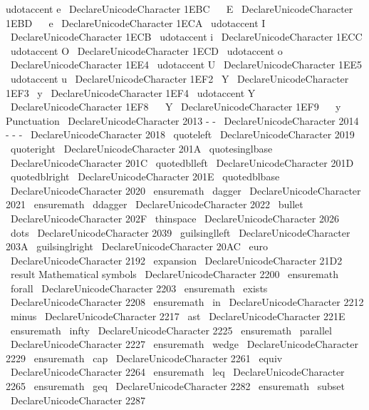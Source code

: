{{{{{{udotaccent
{
e
}
}
%
\
DeclareUnicodeCharacter
{
1EBC
}
{
\
~
E
}
%
\
DeclareUnicodeCharacter
{
1EBD
}
{
\
~
e
}
%
%
\
DeclareUnicodeCharacter
{
1ECA
}
{
\
udotaccent
{
I
}
}
%
\
DeclareUnicodeCharacter
{
1ECB
}
{
\
udotaccent
{
i
}
}
%
\
DeclareUnicodeCharacter
{
1ECC
}
{
\
udotaccent
{
O
}
}
%
\
DeclareUnicodeCharacter
{
1ECD
}
{
\
udotaccent
{
o
}
}
%
%
\
DeclareUnicodeCharacter
{
1EE4
}
{
\
udotaccent
{
U
}
}
%
\
DeclareUnicodeCharacter
{
1EE5
}
{
\
udotaccent
{
u
}
}
%
%
\
DeclareUnicodeCharacter
{
1EF2
}
{
\
Y
}
%
\
DeclareUnicodeCharacter
{
1EF3
}
{
\
y
}
%
\
DeclareUnicodeCharacter
{
1EF4
}
{
\
udotaccent
{
Y
}
}
%
%
\
DeclareUnicodeCharacter
{
1EF8
}
{
\
~
Y
}
%
\
DeclareUnicodeCharacter
{
1EF9
}
{
\
~
y
}
%
%
%
Punctuation
\
DeclareUnicodeCharacter
{
2013
}
{
-
-
}
%
\
DeclareUnicodeCharacter
{
2014
}
{
-
-
-
}
%
\
DeclareUnicodeCharacter
{
2018
}
{
\
quoteleft
{
}
}
%
\
DeclareUnicodeCharacter
{
2019
}
{
\
quoteright
{
}
}
%
\
DeclareUnicodeCharacter
{
201A
}
{
\
quotesinglbase
{
}
}
%
\
DeclareUnicodeCharacter
{
201C
}
{
\
quotedblleft
{
}
}
%
\
DeclareUnicodeCharacter
{
201D
}
{
\
quotedblright
{
}
}
%
\
DeclareUnicodeCharacter
{
201E
}
{
\
quotedblbase
{
}
}
%
\
DeclareUnicodeCharacter
{
2020
}
{
\
ensuremath
\
dagger
}
%
\
DeclareUnicodeCharacter
{
2021
}
{
\
ensuremath
\
ddagger
}
%
\
DeclareUnicodeCharacter
{
2022
}
{
\
bullet
{
}
}
%
\
DeclareUnicodeCharacter
{
202F
}
{
\
thinspace
}
%
\
DeclareUnicodeCharacter
{
2026
}
{
\
dots
{
}
}
%
\
DeclareUnicodeCharacter
{
2039
}
{
\
guilsinglleft
{
}
}
%
\
DeclareUnicodeCharacter
{
203A
}
{
\
guilsinglright
{
}
}
%
%
\
DeclareUnicodeCharacter
{
20AC
}
{
\
euro
{
}
}
%
%
\
DeclareUnicodeCharacter
{
2192
}
{
\
expansion
{
}
}
%
\
DeclareUnicodeCharacter
{
21D2
}
{
\
result
{
}
}
%
%
%
Mathematical
symbols
\
DeclareUnicodeCharacter
{
2200
}
{
\
ensuremath
\
forall
}
%
\
DeclareUnicodeCharacter
{
2203
}
{
\
ensuremath
\
exists
}
%
\
DeclareUnicodeCharacter
{
2208
}
{
\
ensuremath
\
in
}
%
\
DeclareUnicodeCharacter
{
2212
}
{
\
minus
{
}
}
%
\
DeclareUnicodeCharacter
{
2217
}
{
\
ast
}
%
\
DeclareUnicodeCharacter
{
221E
}
{
\
ensuremath
\
infty
}
%
\
DeclareUnicodeCharacter
{
2225
}
{
\
ensuremath
\
parallel
}
%
\
DeclareUnicodeCharacter
{
2227
}
{
\
ensuremath
\
wedge
}
%
\
DeclareUnicodeCharacter
{
2229
}
{
\
ensuremath
\
cap
}
%
\
DeclareUnicodeCharacter
{
2261
}
{
\
equiv
{
}
}
%
\
DeclareUnicodeCharacter
{
2264
}
{
\
ensuremath
\
leq
}
%
\
DeclareUnicodeCharacter
{
2265
}
{
\
ensuremath
\
geq
}
%
\
DeclareUnicodeCharacter
{
2282
}
{
\
ensuremath
\
subset
}
%
\
DeclareUnicodeCharacter
{
2287
}
{
}}}}}}
